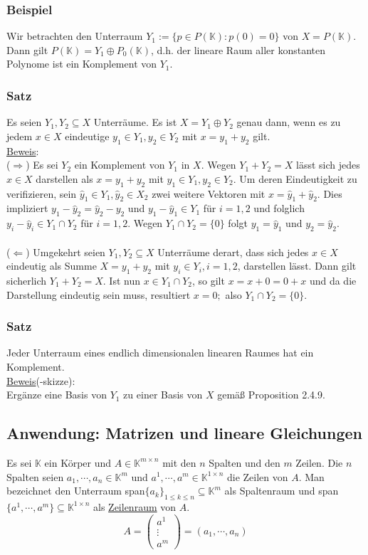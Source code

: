 \subsubsection{Beispiel}
Wir betrachten den Unterraum $Y_1:=\{p\in P(\mathbb{K}):p(0)=0\}$ von $X=P(\mathbb{K})$.  Dann gilt $P(\mathbb{K})=Y_1 \oplus P_0(\mathbb{K})$, d.h. der lineare Raum aller konstanten Polynome ist ein Komplement von $Y_1$.
\subsubsection{Satz}
Es seien $Y_1,Y_2\subseteq X$ Unterräume.  Es ist $X=Y_1\oplus Y_2$ genau dann, wenn es zu jedem $x\in X$ eindeutige $y_1\in Y_1,y_2\in Y_2$ mit $x=y_1+y_2$ gilt.\\
\underline{Beweis}:\\
($\Rightarrow$) Es sei $Y_2$ ein Komplement von $Y_1$ in $X$.  Wegen $Y_1+Y_2=X$ lässt sich jedes $x\in X$ darstellen als $x=y_1+y_2$ mit $y_1\in Y_1,y_2\in Y_2$.  Um deren Eindeutigkeit zu verifizieren, sein $\hat{y}_1\in Y_1,\hat{y}_2\in X_2$ zwei weitere Vektoren mit $x=\hat{y}_1+\hat{y}_2$.  Dies impliziert $y_1-\hat{y}_2=\hat{y}_2-y_2$ und $y_1-\hat{y}_1\in Y_1$ für $i=1,2$ und folglich $y_i-\hat{y}_i\in Y_1\cap Y_2$ für $i=1,2$.  Wegen $Y_1\cap Y_2 = \{0\}$ folgt $y_1=\hat{y}_1$ und $y_2=\hat{y}_2$.\\
\\
($\Leftarrow$) Umgekehrt seien $Y_1,Y_2\subseteq X$ Unterräume derart, dass sich jedes $x\in X$ eindeutig als Summe $X=y_1+y_2$ mit $y_i\in Y_i,i=1,2$, darstellen lässt.  Dann gilt sicherlich $Y_1+Y_2=X$.  Ist nun $x\in Y_1\cap Y_2$, so gilt $x=x+0=0+x$ und da die Darstellung eindeutig sein muss, resultiert $x=0;$ also $Y_1\cap Y_2=\{0\}$.
\subsubsection{Satz}
Jeder Unterraum eines endlich dimensionalen linearen Raumes hat ein Komplement.\\
\underline{Beweis}(-skizze):\\
Ergänze eine Basis von $Y_1$ zu einer Basis von $X$ gemäß Proposition 2.4.9.
\subsection{Anwendung: Matrizen und lineare Gleichungen}
Es sei $\mathbb{K}$ ein Körper und $A\in\mathbb{K}^{m\times n}$ mit den $n$ Spalten und den $m$ Zeilen.  Die $n$ Spalten seien $a_1,\cdots ,a_n\in \mathbb{K}^m$ und $a^1,\cdots ,a^m\in \mathbb{K}^{1\times n}$ die Zeilen von $A$.  Man bezeichnet den Unterraum span$\{a_k\}_{1\leq k\leq n}\subseteq \mathbb{K}^m$ als Spaltenraum und span$\{a^1,\cdots ,a^m\}\subseteq \mathbb{K}^{1\times n}$ als \underline{Zeilenraum} von $A$.
\[A=\begin{pmatrix}a^1\\ \vdots \\ a^m\end{pmatrix} = (a_1,\cdots ,a_n)\]
